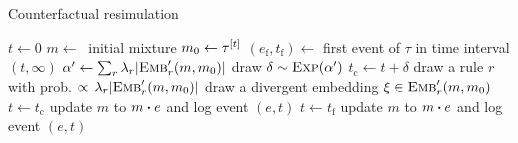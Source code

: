 \newcommand{\EVF}[0]{e_{\text{f}}}
\newcommand{\EVCF}[0]{e_{\text{c}}}

\renewcommand{\algorithmicrequire}{\textbf{Input:}}
\renewcommand{\algorithmicensure}{\textbf{Output:}}

\begin{algorithm}
\caption{Counterfactual resimulation}\label{alg:cosimulation}
\begin{spacing}{1.3}
\begin{algorithmic}[1]
\vspace{0.2cm}
\STATE $t \gets 0$
\STATE $m \gets\ $ initial mixture
  \STATE $m_0 \gets \tau^{[t]}$
  \STATE $(\EVF{}, t_{\text{f}}) \gets $ first event of $\tau$ in time interval $(t, \infty)$
  \vspace{0.1cm}
  \STATE $\alpha' \gets \sum_r {\lambda_r |{\textsc{Emb}}'_{r}(m, m_0)|}$
  \vspace{0.1cm}
  \STATE draw $\delta \sim \textsc{Exp}(\alpha') $
  \STATE $t_{\text{c}} \gets t + \delta$
   \label{cosim:cev}
      \STATE draw a rule $r$ with prob.
      $\propto \, \lambda_r |{\textsc{Emb}}'_{r}(m, m_0)|$
      \STATE  draw a divergent embedding $\xi \in {\textsc{Emb}}'_{r}(m, m_0)$
          \STATE $t \gets t_{\text{c}}$
          \STATE update $m$ to $\UPDATE{m}{e}$ and log event $(e, t)$
      \ENDIF
  \ELSE
      \STATE {$e \gets \EVF{}$}
      \STATE $t \gets t_{\text{f}}$
          \STATE update $m$ to $\UPDATE{m}{e}$ and log event $(e, t)$
      
      \ENDIF 
  \ENDIF
\ENDWHILE
\vspace{0.1cm}
\end{algorithmic}
\end{spacing}
\end{algorithm}